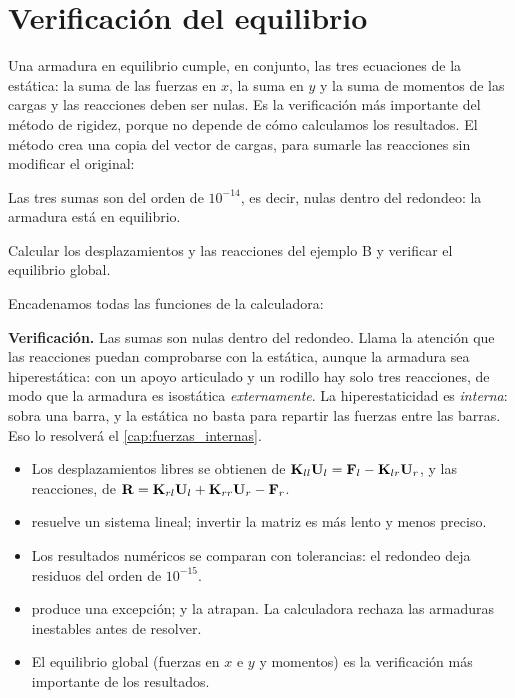 \section{Verificación del equilibrio}\label{sec:equilibrio}

Una armadura en equilibrio cumple, en conjunto, las tres ecuaciones de la
estática: la suma de las fuerzas en $x$, la suma en $y$ y la suma de momentos
de las cargas y las reacciones deben ser nulas. Es la verificación más
importante del método de rigidez, porque no depende de cómo calculamos los
resultados. El método  crea una copia del vector de cargas, para
sumarle las reacciones sin modificar el original:

Las tres sumas son del orden de $10^{-14}$, es decir, nulas dentro del
redondeo: la armadura está en equilibrio.

\begin{problemaresuelto}[El ejemplo B]
Calcular los desplazamientos y las reacciones del ejemplo B y verificar el
equilibrio global.

\solucion
Encadenamos todas las funciones de la calculadora:

\textbf{Verificación.} Las sumas son nulas dentro del redondeo. Llama la
atención que las reacciones puedan comprobarse con la estática, aunque la
armadura sea hiperestática: con un apoyo articulado y un rodillo hay solo tres
reacciones, de modo que la armadura es isostática \emph{externamente}. La
hiperestaticidad es \emph{interna}: sobra una barra, y la estática no basta
para repartir las fuerzas entre las barras. Eso lo resolverá el
\cref{cap:fuerzas_internas}.
\end{problemaresuelto}

\repasoyresumen

\begin{itemize}
  \item Los desplazamientos libres se obtienen de
    $\mathbf{K}_{ll}\mathbf{U}_l = \mathbf{F}_l - \mathbf{K}_{lr}\mathbf{U}_r$, y las reacciones, de
    $\mathbf{R} = \mathbf{K}_{rl}\mathbf{U}_l + \mathbf{K}_{rr}\mathbf{U}_r - \mathbf{F}_r$.
  \item {} resuelve un sistema lineal; invertir la matriz
    es más lento y menos preciso.
  \item Los resultados numéricos se comparan con tolerancias: el redondeo deja
    residuos del orden de $10^{-15}$.
  \item {} produce una excepción;  y  la atrapan.
    La calculadora rechaza las armaduras inestables antes de resolver.
  \item El equilibrio global (fuerzas en $x$ e $y$ y momentos) es la
    verificación más importante de los resultados.
\end{itemize}

